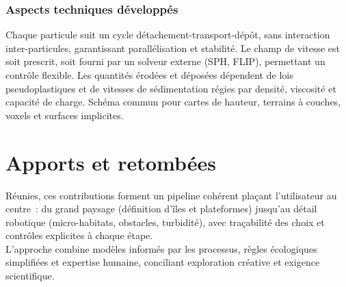 \subsubsection*{Aspects techniques développés}
\begin{Itemize}
     Chaque particule suit un cycle détachement-transport-dépôt, sans interaction inter-particules, garantissant parallélisation et stabilité.
     Le champ de vitesse est soit prescrit, soit fourni par un solveur externe (SPH, FLIP), permettant un contrôle flexible.
     Les quantités érodées et déposées dépendent de lois pseudoplastiques et de vitesses de sédimentation régies par densité, viscosité et capacité de charge.
     Schéma commun pour cartes de hauteur, terrains à couches, voxels et surfaces implicites.
\end{Itemize}

\section*{Apports et retombées}
Réunies, ces contributions forment un pipeline cohérent plaçant l'utilisateur au centre~: du grand paysage (définition d'îles et plateformes) jusqu'au détail robotique (micro-habitats, obstacles, turbidité), avec traçabilité des choix et contrôles explicites à chaque étape. \\
L'approche combine modèles informés par les processus, règles écologiques simplifiées et expertise humaine, conciliant exploration créative et exigence scientifique. \\

